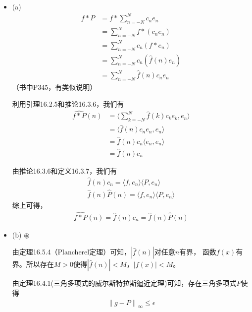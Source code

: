 \documentclass{article}
\begin{document}
\begin{itemize}
  \item (a)
        \begin{align*}
          f \ast P & = f \ast \sum\limits_{n = -N}^N c_n e_n       \\
                   & = \sum\limits_{n = -N}^N f \ast (c_n e_n)     \\
                   & = \sum\limits_{n = -N}^N c_n (f \ast e_n)     \\
                   & = \sum\limits_{n = -N}^N c_n (\hat{f}(n) e_n) \\
                   & = \sum\limits_{n = -N}^N \hat{f}(n) c_n e_n
        \end{align*}
        （书中P345，有类似说明）

        利用引理16.2.5和推论16.3.6，我们有
        \begin{align*}
          \widehat{f \ast P}(n) & = \langle \sum\limits_{k = -N}^N \hat{f}(k) c_k e_k, e_n \rangle \\
                                & = \langle \hat{f}(n) c_n e_n, e_n \rangle                        \\
                                & = \hat{f}(n) c_n \langle e_n, e_n \rangle                        \\
                                & = \hat{f}(n) c_n
        \end{align*}

        由推论16.3.6和定义16.3.7，我们有
        \begin{align*}
          \hat{f}(n) c_n = \langle f, e_n \rangle \langle P, e_n \rangle \\
          \hat{f}(n) \hat{P}(n) = \langle f, e_n \rangle \langle P, e_n \rangle
        \end{align*}
        综上可得，
        \begin{align*}
          \widehat{f \ast P}(n) = \hat{f}(n) c_n = \hat{f}(n) \hat{P}(n)
        \end{align*}

  \item (b) $\circledast$

        由定理16.5.4（Plancherel定理）可知，$|\hat{f}(n)|$对任意$n$有界，
        函数$f(x)$有界。所以存在$M > 0$使得$|\hat{f}(n)| < M$，$|f(x)| < M$。

        由定理16.4.1(三角多项式的威尔斯特拉斯逼近定理)可知，存在三角多项式$P$使得
        \begin{align*}
          \left\|g - P\right\|_{\infty} \leq \epsilon
        \end{align*}


\end{itemize}
\end{document}
